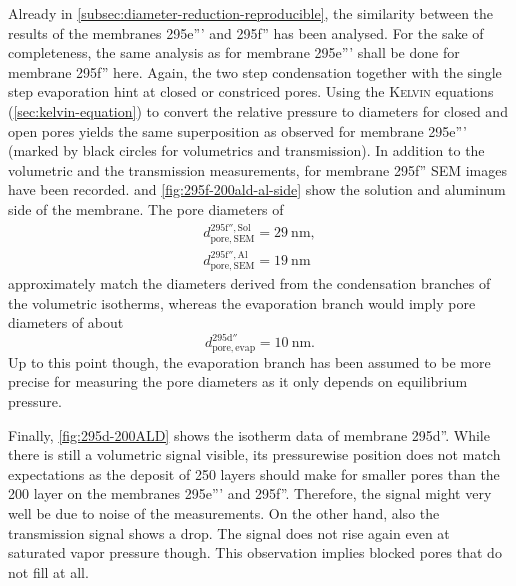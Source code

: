 \documentclass[../thesis.tex]{subfiles}
\begin{document}
        Already in \cref{subsec:diameter-reduction-reproducible}, the similarity between the results of the membranes 295e''' and 295f'' has been analysed. For the sake of completeness, the same analysis as for membrane 295e''' shall be done for membrane 295f'' here. Again, the two step condensation together with the single step evaporation hint at closed or constriced pores. Using the \textsc{Kelvin} equations (\cref{sec:kelvin-equation}) to convert the relative pressure to diameters for closed and open pores yields the same superposition as observed for membrane 295e''' (marked by black circles for volumetrics and transmission). In addition to the volumetric and the transmission measurements, for membrane 295f'' SEM images have been recorded.  and \cref{fig:295f-200ald-al-side} show the solution and aluminum side of the membrane. The pore diameters of
        \begin{equation}
          \begin{split}
              d_\mathrm{pore,SEM}^\mathrm{295f'',Sol}=\SI{29}{\nano\meter}, \\
              d_\mathrm{pore,SEM}^\mathrm{295f'',Al}=\SI{19}{\nano\meter}
          \end{split}
        \end{equation}
        approximately match the diameters derived from the condensation branches of the volumetric isotherms, whereas the evaporation branch would imply pore diameters of about
        \begin{equation}
          d_\mathrm{pore,evap}^\mathrm{295d''}=\SI{10}{\nano\meter}.
        \end{equation}
        Up to this point though, the evaporation branch has been assumed to be more precise for measuring the pore diameters as it only depends on equilibrium pressure.
        \medskip

        Finally, \cref{fig:295d-200ALD} shows the isotherm data of membrane 295d''. While there is still a volumetric signal visible, its pressurewise position does not match expectations as the deposit of 250 layers should make for smaller pores than the 200 layer on the membranes 295e''' and 295f''. Therefore, the signal might very well be due to noise of the measurements. On the other hand, also the transmission signal shows a drop. The signal does not rise again even at saturated vapor pressure though. This observation implies blocked pores that do not fill at all.
\end{document}
